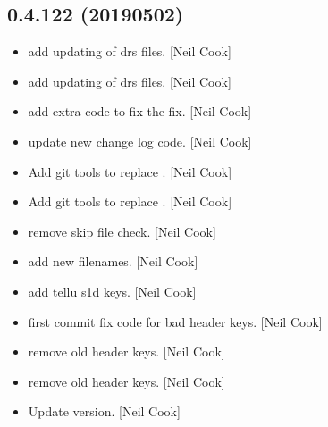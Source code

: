 \documentclass[a4paper,10pt,english]{report}
\begin{document}
\subsection{0.4.122 (2019\sphinxhyphen{}05\sphinxhyphen{}02)}
\label{\detokenize{misc/changelog:id158}}\begin{itemize}
\item {} 
 \sphinxhyphen{} add updating of drs files. {[}Neil Cook{]}

\item {} 
 \sphinxhyphen{} add updating of drs files. {[}Neil Cook{]}

\item {} 
 \sphinxhyphen{} add extra code to fix the fix. {[}Neil Cook{]}

\item {} 
 \sphinxhyphen{} update new change log code. {[}Neil Cook{]}

\item {} 
Add git tools to replace . {[}Neil Cook{]}

\item {} 
Add git tools to replace . {[}Neil Cook{]}

\item {} 
 \sphinxhyphen{} remove skip file check. {[}Neil Cook{]}

\item {} 
 \sphinxhyphen{} add new filenames. {[}Neil Cook{]}

\item {} 
 \sphinxhyphen{} add tellu s1d keys. {[}Neil Cook{]}

\item {} 
 \sphinxhyphen{} first commit fix code for bad header keys.
{[}Neil Cook{]}

\item {} 
 \sphinxhyphen{} remove old header keys. {[}Neil Cook{]}

\item {} 
 \sphinxhyphen{} remove old header keys. {[}Neil Cook{]}

\item {} 
Update version. {[}Neil Cook{]}

\end{itemize}
\end{document}
